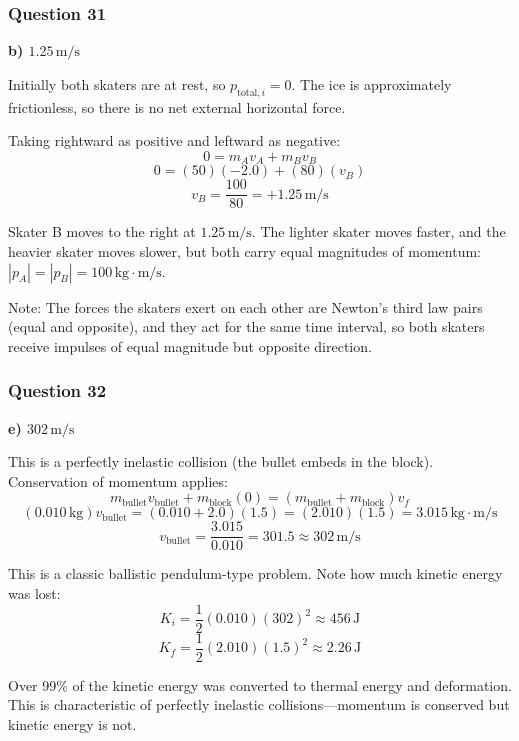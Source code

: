 \documentclass[12pt,letterpaper]{article}
\begin{document}
\subsubsection*{Question 31}

\begin{answerbox}
\textbf{b) $1.25\,\text{m/s}$}
\end{answerbox}

\begin{explanationbox}
Initially both skaters are at rest, so $p_{\text{total},i} = 0$. The ice is approximately frictionless, so there is no net external horizontal force.

Taking rightward as positive and leftward as negative:
\[
0 = m_A v_A + m_B v_B
\]
\[
0 = (50)(-2.0) + (80)(v_B)
\]
\[
v_B = \frac{100}{80} = +1.25\,\text{m/s}
\]

Skater B moves to the right at $1.25\,\text{m/s}$. The lighter skater moves faster, and the heavier skater moves slower, but both carry equal magnitudes of momentum: $|p_A| = |p_B| = 100\,\text{kg}\cdot\text{m/s}$.

Note: The forces the skaters exert on each other are Newton's third law pairs (equal and opposite), and they act for the same time interval, so both skaters receive impulses of equal magnitude but opposite direction.
\end{explanationbox}

\subsubsection*{Question 32}

\begin{answerbox}
\textbf{e) $302\,\text{m/s}$}
\end{answerbox}

\begin{explanationbox}
This is a perfectly inelastic collision (the bullet embeds in the block). Conservation of momentum applies:
\[
m_{\text{bullet}} v_{\text{bullet}} + m_{\text{block}}(0) = (m_{\text{bullet}} + m_{\text{block}}) v_f
\]
\[
(0.010\,\text{kg}) v_{\text{bullet}} = (0.010 + 2.0)(1.5) = (2.010)(1.5) = 3.015\,\text{kg}\cdot\text{m/s}
\]
\[
v_{\text{bullet}} = \frac{3.015}{0.010} = 301.5 \approx 302\,\text{m/s}
\]

This is a classic ballistic pendulum-type problem. Note how much kinetic energy was lost:
\[
K_i = \frac{1}{2}(0.010)(302)^2 \approx 456\,\text{J}
\]
\[
K_f = \frac{1}{2}(2.010)(1.5)^2 \approx 2.26\,\text{J}
\]

Over 99\% of the kinetic energy was converted to thermal energy and deformation. This is characteristic of perfectly inelastic collisions---momentum is conserved but kinetic energy is not.
\end{explanationbox}
\end{document}
